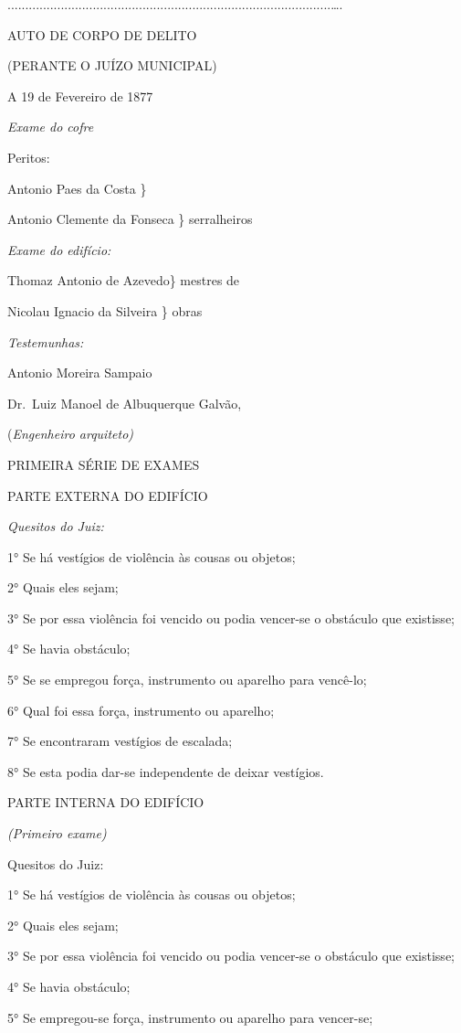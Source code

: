 ...........................................................................................\ldots{}.

AUTO DE CORPO DE DELITO

(PERANTE O JUÍZO MUNICIPAL)

A 19 de Fevereiro de 1877

\emph{Exame do cofre}

Peritos:

Antonio Paes da Costa \}

Antonio Clemente da Fonseca \} serralheiros

\emph{Exame do edifício:}

Thomaz Antonio de Azevedo\} mestres de

Nicolau Ignacio da Silveira \} obras

\emph{Testemunhas:}

Antonio Moreira Sampaio

Dr.~Luiz Manoel de Albuquerque Galvão,

(\emph{Engenheiro arquiteto)}

PRIMEIRA SÉRIE DE EXAMES

PARTE EXTERNA DO EDIFÍCIO

\emph{Quesitos do Juiz:}

1° Se há vestígios de violência às cousas ou objetos;

2° Quais eles sejam;

3° Se por essa violência foi vencido ou podia vencer-se o obstáculo que
existisse;

4° Se havia obstáculo;

5° Se se empregou força, instrumento ou aparelho para vencê-lo;

6° Qual foi essa força, instrumento ou aparelho;

7° Se encontraram vestígios de escalada;

8° Se esta podia dar-se independente de deixar vestígios.

PARTE INTERNA DO EDIFÍCIO

\emph{(Primeiro exame)}

Quesitos do Juiz:

1° Se há vestígios de violência às cousas ou objetos;

2° Quais eles sejam;

3° Se por essa violência foi vencido ou podia vencer-se o obstáculo que
existisse;

4° Se havia obstáculo;

5° Se empregou-se força, instrumento ou aparelho para vencer-se;


